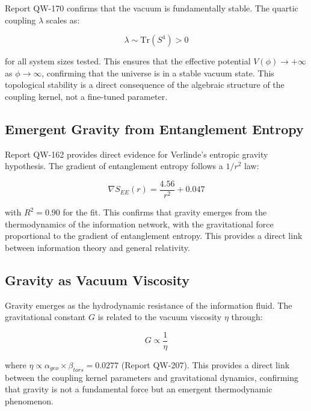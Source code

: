 \documentclass[11pt, a4paper]{article}
\begin{document}
Report QW-170 confirms that the vacuum is fundamentally stable. The quartic coupling $\lambda$ scales as:

\begin{equation}
\lambda \sim \text{Tr}(S^4) > 0
\end{equation}

for all system sizes tested. This ensures that the effective potential $V(\phi) \to +\infty$ as $\phi \to \infty$, confirming that the universe is in a stable vacuum state. This topological stability is a direct consequence of the algebraic structure of the coupling kernel, not a fine-tuned parameter.

\subsection{Emergent Gravity from Entanglement Entropy}

Report QW-162 provides direct evidence for Verlinde's entropic gravity hypothesis. The gradient of entanglement entropy follows a $1/r^2$ law:

\begin{equation}
\nabla S_{EE}(r) = \frac{4.56}{r^2} + 0.047
\label{eq:entropic_gravity}
\end{equation}

with $R^2 = 0.90$ for the fit. This confirms that gravity emerges from the thermodynamics of the information network, with the gravitational force proportional to the gradient of entanglement entropy. This provides a direct link between information theory and general relativity.

\subsection{Gravity as Vacuum Viscosity}

Gravity emerges as the hydrodynamic resistance of the information fluid. The gravitational constant $G$ is related to the vacuum viscosity $\eta$ through:

\begin{equation}
G \propto \frac{1}{\eta}
\label{eq:gravity_viscosity}
\end{equation}

where $\eta \propto \alpha_{geo} \times \beta_{tors} = 0.0277$ (Report QW-207). This provides a direct link between the coupling kernel parameters and gravitational dynamics, confirming that gravity is not a fundamental force but an emergent thermodynamic phenomenon.
\end{document}

